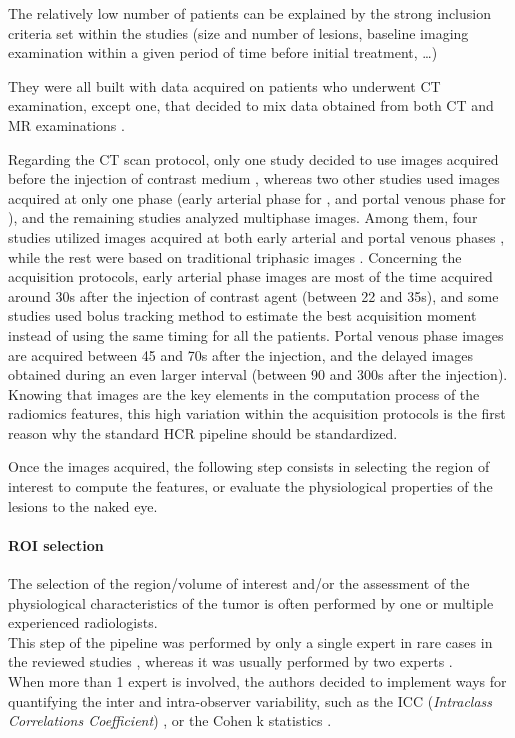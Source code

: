 \documentclass[]{article}
\let\oldparagraph\paragraph
\renewcommand{\paragraph}[1]{\oldparagraph{#1}\mbox{}}
\begin{document}
The relatively low number of patients can be explained by the strong
inclusion criteria set within the studies (size and number of lesions,
baseline imaging examination within a given period of time before
initial treatment, \ldots{})

They were all built with data acquired on patients who underwent CT
examination, except one, that decided to mix data obtained from both CT
and MR examinations \cite{Taouli2017}.

Regarding the CT scan protocol, only one study decided to use images
acquired before the injection of contrast medium \cite{Cozzi2017}, whereas two other studies used images acquired at only one
phase (early arterial phase for \cite{Raman2015}, and portal
venous phase for \cite{Li2016}), and the remaining studies
analyzed multiphase images. Among them, four studies utilized images
acquired at both early arterial and portal venous phases \cite{Zhou2017a,Chen2017,Kuo2007,Zheng2018}, while the rest were
based on traditional triphasic images \cite{Akai2018,Banerjee2015,Renzulli2016,Segal2007,Peng2018,Bakr2017,Taouli2017,Xia2018}. Concerning the
acquisition protocols, early arterial phase images are most of the time
acquired around 30s after the injection of contrast agent (between 22
and 35s), and some studies used bolus tracking method to estimate the
best acquisition moment instead of using the same timing for all the
patients. Portal venous phase images are acquired between 45 and 70s
after the injection, and the delayed images obtained during an even
larger interval (between 90 and 300s after the injection).\\
Knowing that images are the key elements in the computation process of
the radiomics features, this high variation within the acquisition
protocols is the first reason why the standard HCR pipeline
should be standardized.

Once the images acquired, the following step consists in selecting the
region of interest to compute the features, or evaluate the
physiological properties of the lesions to the naked eye.

\paragraph{ROI selection}\label{roi-selection}

The selection of the region/volume of interest and/or the assessment of
the physiological characteristics of the tumor is often performed by one
or multiple experienced radiologists.\\
This step of the pipeline was performed by only a single expert in rare
cases in the reviewed studies \cite{Xia2018,Akai2018}, whereas it was
usually performed by two experts \cite{Zhou2017a,Chen2017,Li2016,Raman2015,Kuo2007,Renzulli2016,Segal2007,Zheng2018,Peng2018,Taouli2017}.\\
When more than 1 expert is involved, the authors decided to implement
ways for quantifying the inter and intra-observer variability, such as
the ICC (\emph{Intraclass Correlations Coefficient}) \cite{Zheng2018,Li2016}, or the Cohen k statistics \cite{Renzulli2016,Banerjee2015}.
\end{document}
